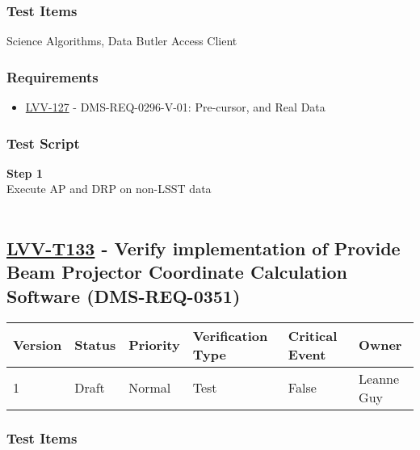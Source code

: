 \hypertarget{test-items-108}{%
\subsubsection{Test Items}\label{test-items-108}}

Science Algorithms, Data Butler Access Client~

\hypertarget{requirements-109}{%
\subsubsection{Requirements}\label{requirements-109}}

\begin{itemize}
\tightlist
\item
  \href{https://jira.lsstcorp.org/browse/LVV-127}{LVV-127} -
  DMS-REQ-0296-V-01: Pre-cursor, and Real Data
\end{itemize}

\hypertarget{test-script-109}{%
\subsubsection{Test Script}\label{test-script-109}}

\textbf{Step 1}\\
Execute AP and DRP on non-LSST data\\
~\\

\hypertarget{lvv-t133---verify-implementation-of-provide-beam-projector-coordinate-calculation-software-dms-req-0351}{%
\subsection{\texorpdfstring{\href{https://jira.lsstcorp.org/secure/Tests.jspa\#/testCase/LVV-T133}{LVV-T133}
- Verify implementation of Provide Beam Projector Coordinate Calculation
Software
(DMS-REQ-0351)}{LVV-T133 - Verify implementation of Provide Beam Projector Coordinate Calculation Software (DMS-REQ-0351)}}\label{lvv-t133---verify-implementation-of-provide-beam-projector-coordinate-calculation-software-dms-req-0351}}

\begin{longtable}[]{@{}llllll@{}}
\toprule
Version & Status & Priority & Verification Type & Critical Event &
Owner\tabularnewline
\midrule
\endhead
1 & Draft & Normal & Test & False & Leanne Guy\tabularnewline
\bottomrule
\end{longtable}

\hypertarget{test-items-109}{%
\subsubsection{Test Items}\label{test-items-109}}

